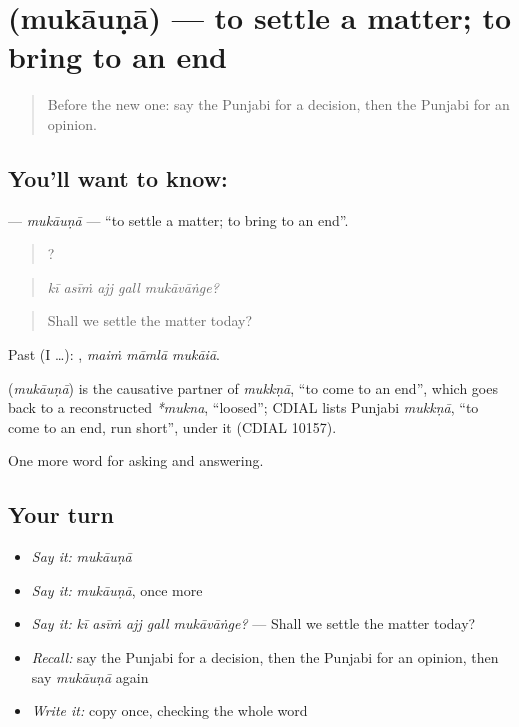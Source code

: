 \section[\texorpdfstring{\pa{ਮੁਕਾਉਣਾ} (mukāuṇā)}{ਮੁਕਾਉਣਾ (mukāuṇā)}]{ (mukāuṇā) — to settle a matter; to bring to an end}

\label{lesson:PA-C345-mukauna}



\begin{quote}
Before the new one: say the Punjabi for a decision, then the Punjabi for an opinion.
\end{quote}

\subsection*{You'll want to know: }
\textbf{} — \emph{mukāuṇā} — \textquotedblleft{}to settle a matter; to bring to an end\textquotedblright{}.

\begin{quote}
    ?
\end{quote}

\begin{quote}
\emph{kī asīṁ ajj gall mukāvāṅge?}
\end{quote}

\begin{quote}
Shall we settle the matter today?
\end{quote}

Past (I …):   , \emph{maiṁ māmlā mukāiā}.

\begin{cousinweb}
\textbf{} (\emph{mukāuṇā}) is the causative partner of \emph{mukkṇā}, \textquotedblleft{}to come to an end\textquotedblright{}, which goes back to a reconstructed \emph{*mukna}, \textquotedblleft{}loosed\textquotedblright{}; CDIAL lists Punjabi \emph{mukkṇā}, \textquotedblleft{}to come to an end, run short\textquotedblright{}, under it (CDIAL 10157).
\end{cousinweb}

\begin{grammarlens}[title={What you've built}]
One more word for asking and answering.
\end{grammarlens}

\subsection*{Your turn}
\begin{itemize}
\raggedright
  \item \emph{Say it:} \emph{mukāuṇā}
  \item \emph{Say it:} \emph{mukāuṇā}, once more
  \item \emph{Say it:} \emph{kī asīṁ ajj gall mukāvāṅge?} — Shall we settle the matter today?
  \item \emph{Recall:} say the Punjabi for a decision, then the Punjabi for an opinion, then say \emph{mukāuṇā} again
  \item \emph{Write it:} copy \textbf{} once, checking the whole word
\end{itemize}

